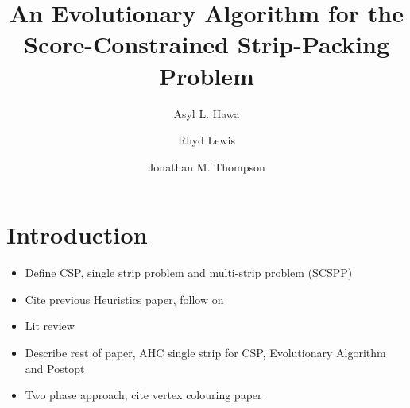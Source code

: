 \documentclass{elsarticle}
\begin{document}
	
\begin{frontmatter}
\title{An Evolutionary Algorithm for the Score-Constrained Strip-Packing Problem}
\author{Asyl L. Hawa}
\author{Rhyd Lewis}
\author{Jonathan M. Thompson}
\address{School of Mathematics, Cardiff University, Senghennydd Road, Cardiff, UK}

\begin{abstract}

\end{abstract}	

\end{frontmatter}


\section{Introduction}
\begin{itemize}
	\item Define CSP, single strip problem and multi-strip problem (SCSPP)
	\item Cite previous Heuristics paper, follow on
	\item Lit review
	\item Describe rest of paper, AHC single strip for CSP, Evolutionary Algorithm and Postopt
	\item Two phase approach, cite vertex colouring paper
\end{itemize}
\end{document}
